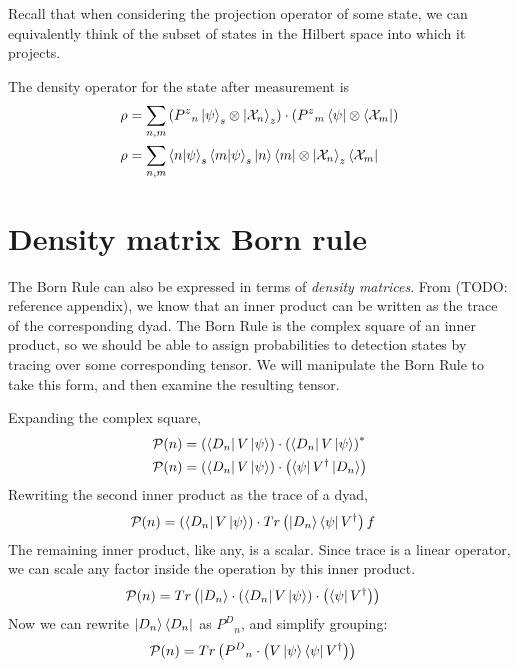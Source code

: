 Recall that when considering the projection operator of some state, we can equivalently think of the subset of states in the Hilbert space into which it projects.

The density operator for the state after measurement is
\begin{align}
\rho &= \sum_{n,m}\left({P^z}_n\ket{\psi}_s \otimes \ket{\mathcal{X}_n}_z \right) \cdot \left({P^z}_m\bra{\psi} \otimes \bra{\mathcal{X}_m} \right) \\
\rho &=  \sum_{n,m}\braket{n|\psi}_s \braket{m|\psi}_s \ket{n}\bra{m} \otimes \ket{\mathcal{X}_n}_z \bra{\mathcal{X}_m}
\end{align}

\section{Density matrix Born rule}
The Born Rule can also be expressed in terms of \textit{density matrices}. From (TODO: reference appendix), we know that an inner product can be written as the trace of the corresponding dyad. The Born Rule is the complex square of an inner product, so we should be able to assign probabilities to detection states by tracing over some corresponding tensor. We will manipulate the Born Rule to take this form, and then examine the resulting tensor.

Expanding the complex square,
\begin{align}
  \mathcal{P}(n) &= \left(\bra{D_n}V\ket{\psi}\right) \cdot \left(\bra{D_n}V\ket{\psi}\right)^* \\
  \mathcal{P}(n) &= \left(\bra{D_n}V\ket{\psi}\right) \cdot \left(\bra{\psi}V^\dagger\ket{D_n}\right)
\end{align}
Rewriting the second inner product as the trace of a dyad,
\begin{align}
  \mathcal{P}(n) &= \left(\bra{D_n}V\ket{\psi}\right) \cdot Tr\left(\ket{D_n}\bra{\psi}V^\dagger\right)f
\end{align}
The remaining inner product, like any, is a scalar. Since trace is a linear operator, we can scale any factor inside the operation by this inner product.
\begin{align}
  \mathcal{P}(n) &= Tr\left(\ket{D_n} \cdot \left(\bra{D_n}V\ket{\psi}\right) \cdot \left(\bra{\psi}V^\dagger\right)\right)
\end{align}
Now we can rewrite $\ket{D_n}\bra{D_n}$ as ${P^D}_n$, and simplify grouping:
\begin{align}
  \mathcal{P}(n) &= Tr\left({P^D}_n \cdot \left(V\ket{\psi}\bra{\psi}V^\dagger\right)\right)
\end{align}


